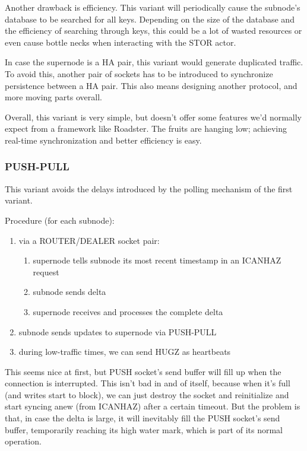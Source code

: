 Another drawback is efficiency. This variant will periodically cause the
subnode's database to be searched for all keys. Depending on the size of the
database and the efficiency of searching through keys, this could be a lot of
wasted resources or even cause bottle necks when interacting with the STOR
actor.

In case the supernode is a HA pair, this variant would generate duplicated
traffic. To avoid this, another pair of sockets has to be introduced to
synchronize persistence between a HA pair. This also means designing another
protocol, and more moving parts overall.

Overall, this variant is very simple, but doesn't offer some features we'd
normally expect from a framework like Roadster. The fruits are hanging low;
achieving real-time synchronization and better efficiency is easy.

\subsubsection{PUSH-PULL}
This variant avoids the delays introduced by the polling mechanism of the first variant.

Procedure (for each subnode):
\begin{enumerate}
	\item via a ROUTER/DEALER socket pair:
		\begin{enumerate}
			\item supernode tells subnode its most recent timestamp in an ICANHAZ request
			\item subnode sends delta
			\item supernode receives and processes the complete delta
		\end{enumerate}
	\item subnode sends updates to supernode via PUSH-PULL
	\item during low-traffic times, we can send HUGZ as heartbeats
\end{enumerate}

This seems nice at first, but PUSH socket's send buffer will fill up when the
connection is interrupted.  This isn't bad in and of itself, because when it's
full (and writes start to block), we can just destroy the socket and
reinitialize and start syncing anew (from ICANHAZ) after a certain timeout.
But the problem is that, in case the delta is large, it will inevitably fill
the PUSH socket's send buffer, temporarily reaching its high water mark, which
is part of its normal operation.

